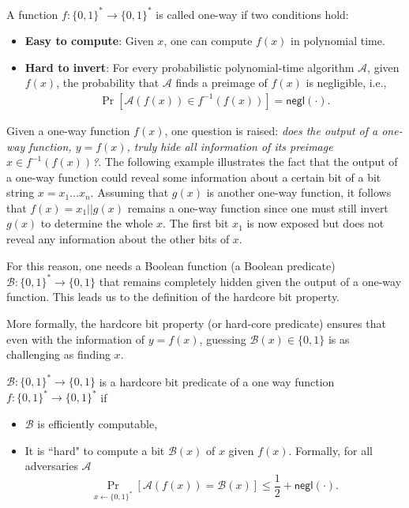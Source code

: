 \documentclass[cryptography,review,submit,pdftex,moreauthors,amsmath,amssymb,aps,strict]{Definitions/mdpi}
\begin{document}
\begin{Definition}
    A function $f:\{0,1\}^* \to \{0,1\}^*$ is called one-way if two conditions hold:
    \begin{itemize}
        \item \textbf{Easy to compute}: Given $x$, one can compute $f(x)$ in polynomial time.
        \item \textbf{Hard to invert}: For every probabilistic polynomial-time algorithm $\mathcal{A}$, given $f(x)$, the probability that $\mathcal{A}$ finds a preimage of $f(x)$ is negligible, i.e.,
        \begin{align}
            \Pr[\mathcal{A}(f(x)) \in f^{-1}(f(x))] = \mathsf{negl}(\cdot).
        \end{align}
    \end{itemize}
\end{Definition}

Given a one-way function $f(x)$, one question is raised: \textit{does the output of a one-way function, $y=f(x)$, truly hide all information of its preimage $x\in f^{-1}(f(x))$?}. The following example illustrates the fact that the output of a one-way function could reveal some information about a certain bit of a bit string $x=x_1\dots x_n$. Assuming that $g(x)$ is another one-way function, it follows that $f(x) = x_1||g(x)$ remains a one-way function since one must still invert $g(x)$ to determine the whole $x$. The first bit $x_1$ is now exposed but does not reveal any information about the other bits of $x$.

For this reason, one needs a Boolean function (a Boolean predicate) $\mathcal{B}:\{0,1\}^*\to\{0,1\}$ that remains completely hidden given the output of a one-way function. This leads us to the definition of the hardcore bit property.

\noindent More formally, the hardcore bit property (or hard-core predicate) ensures that even with the information of $y=f(x)$, guessing $\mathcal{B}(x)\in\{0,1\}$ is as challenging as finding $x$. 

\begin{Definition}
    $\mathcal{B}:\{0,1\}^*\to\{0,1\}$ is a hardcore bit predicate of a one way function $f:\{0,1\}^*\to\{0,1\}^*$ if
    \begin{itemize}
        \item $\mathcal{B}$ is efficiently computable,
        \item It is “hard" to compute a bit $\mathcal{B}(x)$ of $x$ given $f(x)$. Formally, for all adversaries $\mathcal{A}$
        $$\Pr_{x\gets\{0,1\}^*}[\mathcal{A}(f(x))=\mathcal{B}(x)]\leq \displaystyle\frac{1}{2}+\mathsf{negl}(\cdot).$$
    \end{itemize}
\end{Definition}
\end{document}
